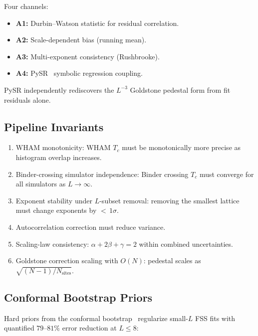\documentclass[11pt,a4paper]{article}
\begin{document}
Four channels:
\begin{itemize}
  \item \textbf{A1:} Durbin--Watson statistic for residual correlation.
  \item \textbf{A2:} Scale-dependent bias (running mean).
  \item \textbf{A3:} Multi-exponent consistency (Rushbrooke).
  \item \textbf{A4:} PySR~\cite{cranmer2023} symbolic regression coupling.
\end{itemize}
PySR independently rediscovers the $L^{-3}$ Goldstone pedestal form from fit residuals alone.

\subsection{Pipeline Invariants}\label{sec:invariants}

\begin{enumerate}
  \item[\textbf{I1.}] WHAM monotonicity: WHAM $T_c$ must be monotonically more precise as histogram overlap increases.
  \item[\textbf{I2.}] Binder-crossing simulator independence: Binder crossing $T_c$ must converge for all simulators as $L \to \infty$.
  \item[\textbf{I3.}] Exponent stability under $L$-subset removal: removing the smallest lattice must change exponents by ${<}\,1\sigma$.
  \item[\textbf{I4.}] Autocorrelation correction must reduce variance.
  \item[\textbf{I5.}] Scaling-law consistency: $\alpha + 2\beta + \gamma = 2$ within combined uncertainties.
  \item[\textbf{I6.}] Goldstone correction scaling with $O(N)$: pedestal scales as $\sqrt{(N{-}1)/N_{\text{sites}}}$.
\end{enumerate}

\subsection{Conformal Bootstrap Priors}\label{sec:bootstrap}

Hard priors from the conformal bootstrap~\cite{kos2015,elshowk2012} regularize small-$L$ FSS fits with quantified $79$--$81\%$ error reduction at $L \leq 8$:
\end{document}
